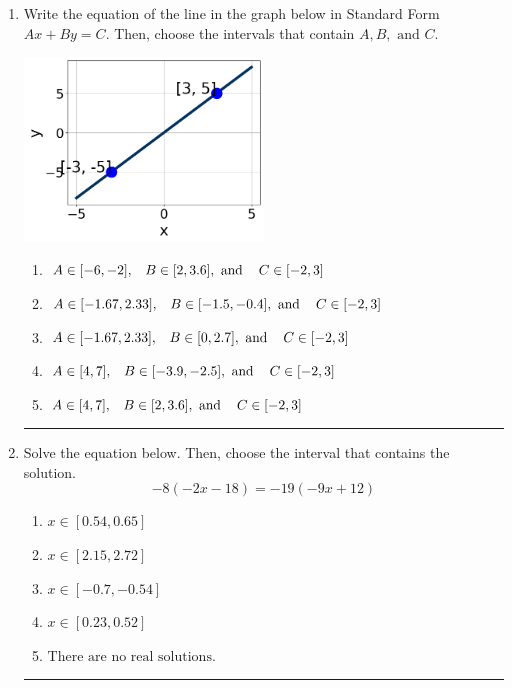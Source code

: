 \documentclass[14pt]{extbook}
\newcommand{\litem}[1]{\item#1\hspace*{-1cm}\rule{\textwidth}{0.4pt}}
\begin{document}
\begin{enumerate}
{\begin{enumerate}[label=\Alph*.]
\end{enumerate} }
\litem{
Write the equation of the line in the graph below in Standard Form $Ax+By=C$. Then, choose the intervals that contain $A, B, \text{ and } C$.
\begin{center}
    \includegraphics[width=0.5\textwidth]{../Figures/linearGraphToStandardCopyB.png}
\end{center}
\begin{enumerate}[label=\Alph*.]
\item \( A \in [-6, -2], \hspace{3mm} B \in [2, 3.6], \text{ and } \hspace{3mm} C \in [-2, 3] \)
\item \( A \in [-1.67, 2.33], \hspace{3mm} B \in [-1.5, -0.4], \text{ and } \hspace{3mm} C \in [-2, 3] \)
\item \( A \in [-1.67, 2.33], \hspace{3mm} B \in [0, 2.7], \text{ and } \hspace{3mm} C \in [-2, 3] \)
\item \( A \in [4, 7], \hspace{3mm} B \in [-3.9, -2.5], \text{ and } \hspace{3mm} C \in [-2, 3] \)
\item \( A \in [4, 7], \hspace{3mm} B \in [2, 3.6], \text{ and } \hspace{3mm} C \in [-2, 3] \)

\end{enumerate} }
\litem{
Solve the equation below. Then, choose the interval that contains the solution.\[ -8(-2x -18) = -19(-9x + 12) \]\begin{enumerate}[label=\Alph*.]
\item \( x \in [0.54, 0.65] \)
\item \( x \in [2.15, 2.72] \)
\item \( x \in [-0.7, -0.54] \)
\item \( x \in [0.23, 0.52] \)
\item \( \text{There are no real solutions.} \)


\end{enumerate}}
\end{enumerate}
\end{document}
